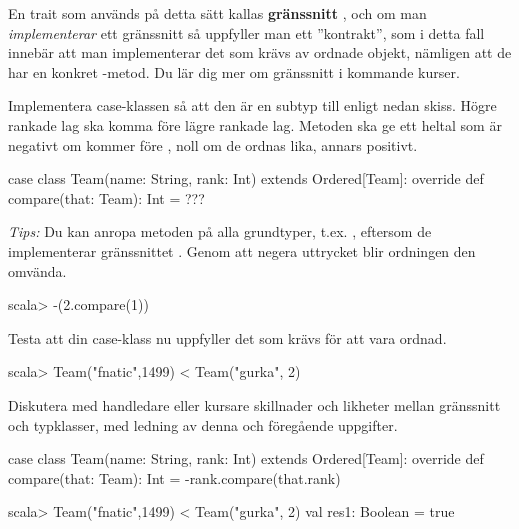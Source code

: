 \begin{Background}
En trait som används på detta sätt kallas \textbf{gränssnitt} , och om man \emph{implementerar} ett gränssnitt så uppfyller man ett ''kontrakt'', som i detta fall innebär att man implementerar det som krävs av ordnade objekt, nämligen att de har en konkret -metod. Du lär dig mer om gränssnitt i kommande kurser.
\end{Background}

\Subtask Implementera case-klassen  så att den är en subtyp till  enligt nedan skiss. Högre rankade lag ska komma före lägre rankade lag. Metoden  ska ge ett heltal som är negativt om  kommer före , noll om de ordnas lika, annars positivt.

\begin{Code}
case class Team(name: String, rank: Int) extends Ordered[Team]:
  override def compare(that: Team): Int = ???
\end{Code}
\emph{Tips:} Du kan anropa metoden  på alla grundtyper, t.ex. , eftersom de implementerar gränssnittet . Genom att negera uttrycket blir ordningen den omvända. 

\begin{REPLnonum}
scala> -(2.compare(1))
\end{REPLnonum}

\Subtask Testa att  din case-klass nu uppfyller det som krävs för att vara ordnad.
\begin{REPLnonum}
scala> Team("fnatic",1499) < Team("gurka", 2)
\end{REPLnonum}


\Subtask Diskutera med handledare eller kursare skillnader och likheter mellan gränssnitt och typklasser, med ledning av denna och föregående uppgifter.
\SOLUTION


\TaskSolved \what

\SubtaskSolved

\begin{Code}
case class  Team(name: String, rank: Int) extends Ordered[Team]:
  override def compare(that: Team): Int = -rank.compare(that.rank)
\end{Code}

\SubtaskSolved

\begin{REPLnonum}
scala> Team("fnatic",1499) < Team("gurka", 2)
val res1: Boolean = true
\end{REPLnonum}

